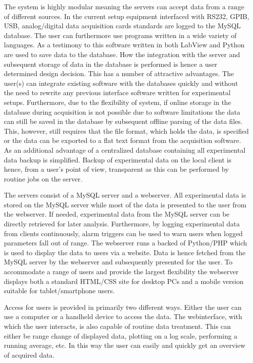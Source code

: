 The system is highly modular meaning the servers can accept data from a range
of different sources. In the current setup equipment interfaced with RS232,
GPIB, USB, analog/digital data acquisition cards standards are logged to the
MySQL database. The user can furthermore use programs written in a wide variety
of languages. As a testimony to this software written in both LabView and
Python are used to save data to the database. How the integration with the
server and subsequent storage of data in the database is performed is hence a
user determined design decision. This has a number of attractive advantages.
The user(s) can integrate existing software with the databases quickly and
without the need to rewrite any previous interface software written for
experimental setups. Furthermore, due to the flexibility of system, if online
storage in the database during acquisition is not possible due to software
limitations the data can still be saved in the database by subsequent offline
parsing of the data files. This, however, still requires that the file format,
which holds the data, is specified or the data can be exported to a flat text
format from the acquisition software. As an additional advantage of a
centralized database containing all experimental data backup is simplified.
Backup of experimental data on the local client is hence, from a user's point
of view, transparent as this can be performed by routine jobs on the server.

The servers consist of a MySQL server and a webserver. All experimental data is
stored on the MySQL server while most of the data is presented to the user from
the webserver. If needed, experimental data from the MySQL server can be
directly retrieved for later analysis. Furthermore, by logging experimental
data from clients continuously, alarm triggers can be used to warn users when
logged parameters fall out of range. The webserver runs a backed of Python/PHP
which is used to display the data to users via a website. Data is hence fetched
from the MySQL server by the webserver and subsequently presented for the user.
To accommodate a range of users and provide the largest flexibility the
webserver displays both a standard HTML/CSS site for desktop PCs and a mobile
version suitable for tablet/smartphone users.

Access for users is provided in primarily two different ways. Either the user
can use a computer or a handheld device to access the data. The webinterface,
with which the user interacts, is also capable of routine data treatment. This
can either be range change of displayed data, plotting on a log scale,
performing a running average, etc. In this way the user can easily and quickly
get an overview of acquired data.
